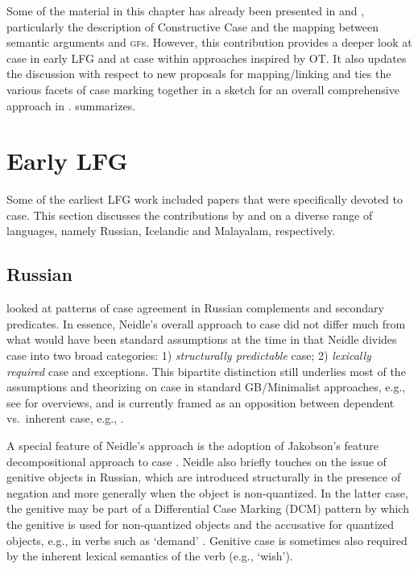 \documentclass[output=paper,hidelinks]{langscibook}
\begin{document}
Some of the material in this chapter has already been presented in
\citet{Butt2006} and \citet{Butt2008}, particularly the description of Constructive
Case and the mapping between semantic arguments and \textsc{gf}s.  However, this
contribution provides a deeper look at case in early LFG and at case within
approaches inspired by OT. It also updates the discussion with respect to new
proposals for mapping/linking and ties the various facets of case marking together in a
sketch for an overall comprehensive approach in
.  
summarizes.

\section{Early LFG}
\label{sec:early}

Some of the earliest LFG work included papers that were specifically devoted to
case.  This section discusses the contributions by \citet{Neidle1982,Andrews82} and
\citet{mohanan1982} on a diverse range  of languages, namely Russian,
Icelandic and Malayalam, respectively.

\subsection{Russian}

\citet{Neidle1982} looked at patterns of case agreement in Russian complements
and secondary predicates.  In essence, Neidle's overall approach to case
did not differ much from what would have been standard assumptions at
the time in that Neidle divides case into two broad categories:
1) {\em structurally predictable} case; 2) {\em lexically required} case and
exceptions.  This bipartite distinction still underlies most of the assumptions
and theorizing on case in standard GB/Minimalist approaches,
e.g., see \citet{Butt2006,Bobaljik-Wurmbrand2008} for overviews, and is currently framed as an
opposition between  dependent vs.~inherent case, e.g.,  \citet{baker-bobaljik17}. 

A special feature of Neidle's approach is the adoption of Jakobson's feature
decompositional approach to case \citep{Jakobson1936}.  Neidle also briefly touches on the issue of
genitive objects in Russian, which are introduced structurally in the presence
of negation and more generally when the object is non-quantized.  In the latter
case, the genitive may be part of a Differential Case Marking (DCM) pattern by which the genitive is used
for non-quantized objects and the accusative for quantized objects, e.g., in
verbs such as `demand' \citep[400]{Neidle1982}.  Genitive case is sometimes also
required by the inherent lexical semantics of the verb (e.g., `wish').
\end{document}
